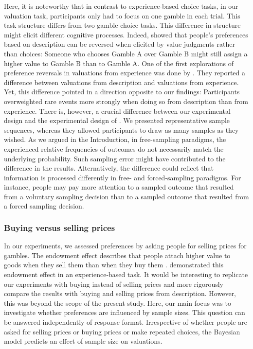 \documentclass[a4paper, man, natbib, floatsintext]{apa6} %
\begin{document}
Here, it is noteworthy that in contrast to experience-based choice tasks, in our valuation task, participants only had to focus on one gamble in each trial. This task structure differs from two-gamble choice tasks. This difference in structure might elicit different cognitive processes. Indeed, \cite{Lichtenstein1971} showed that people's preferences based on description can be reversed when elicited by value judgments rather than choices: Someone who chooses Gamble A over Gamble B might still assign a higher value to Gamble B than to Gamble A. One of the first explorations of preference reversals in valuations from experience was done by \cite{Golan2014}. They reported a difference between valuations from description and valuations from experience. Yet, this difference pointed in a direction opposite to our findings: Participants overweighted rare events more strongly when doing so from description than from experience. There is, however, a crucial difference between our experimental design and the experimental design of \cite{Golan2014}. We presented representative sample sequences, whereas they allowed participants to draw as many samples as they wished. As we argued in the Introduction, in free-sampling paradigms, the experienced relative frequencies of outcomes do not necessarily match the underlying probability. Such sampling error might have contributed to the difference in the results. 
Alternatively, the difference could reflect that information is processed differently in free- and forced-sampling paradigms. For instance, people may pay more attention to a sampled outcome that resulted from a voluntary sampling decision than to a sampled outcome that resulted from a forced sampling decision.

\subsubsection{Buying versus selling prices}
In our experiments, we assessed preferences by asking people for selling prices for gambles. 
The endowment effect describes that people attach higher value to goods when they sell them than when they buy them \citep{Thaler1980}. \cite{Pachur2012} demonstrated this endowment effect in an experience-based task. It would be interesting to replicate our experiments with buying instead of selling prices and more rigorously compare the results with buying and selling prices from description. However, this was beyond the scope of the present study. Here, our main focus was to investigate whether preferences are influenced by sample sizes. This question can be answered independently of response format. Irrespective of whether people are asked for selling prices or buying prices or make repeated choices, the Bayesian model predicts an effect of sample size on valuations. 
\end{document}
